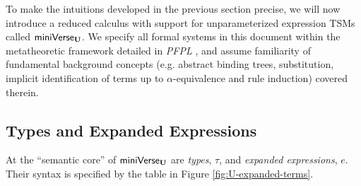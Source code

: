 

To make the intuitions developed in the previous section precise, we will now introduce a reduced calculus with support for unparameterized expression TSMs called $\mathsf{miniVerse}_\textbf{U}$. 
We specify all formal systems in this document within the metatheoretic framework detailed in \emph{PFPL} \cite{pfpl}, and assume familiarity of fundamental background concepts (e.g. abstract binding trees, substitution, implicit identification of terms up to $\alpha$-equivalence and rule induction) covered therein. %

\subsection{Types and Expanded Expressions}
At the ``semantic core'' of $\mathsf{miniVerse}_\textbf{U}$ are \emph{types}, $\tau$, and \emph{expanded expressions}, $e$. Their syntax is specified by the table in Figure \ref{fig:U-expanded-terms}. 

